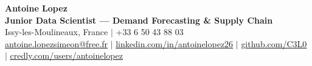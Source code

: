 \documentclass[letterpaper,10pt]{article}
\begin{document}
\begin{center}
    {\Huge \textbf{Antoine Lopez}} \\ \vspace{2pt}
    {\large \textbf{Junior Data Scientist — Demand Forecasting \& Supply Chain}} \\ \vspace{3pt}
    \small
    Issy-les-Moulineaux, France $|$ +33 6 50 43 88 03 \\
    \href{mailto:antoine.lopezsimeon@free.fr}{\underline{antoine.lopezsimeon@free.fr}} $|$ 
    \href{https://linkedin.com/in/antoinelopez26}{\underline{linkedin.com/in/antoinelopez26}} $|$
    \href{https://github.com/C3L0}{\underline{github.com/C3L0}} $|$
    \href{https://www.credly.com/users/antoinelopez26}{\underline{credly.com/users/antoinelopez}}
\end{center}

\vspace{-10pt}







\end{document}
